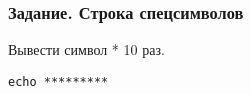 \begin{frame}[fragile]
	\frametitle{Задание. Строка спецсимволов}
Вывести символ * 10 раз.
				\begin{lstlisting}
echo *********
                                \end{lstlisting}
\end{frame}
